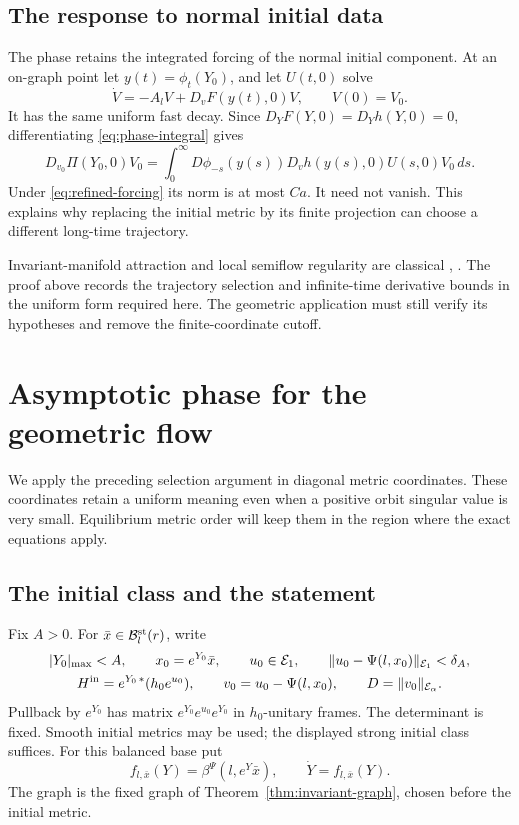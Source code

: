 \documentclass[11pt]{amsart}
\theoremstyle{definition}
\theoremstyle{remark}
\begin{document}
\subsection{The response to normal initial data}
The phase retains the integrated forcing of the normal initial
component. At an on-graph point let $y(t)=\phi_t(Y_0)$, and let
$U(t,0)$ solve
\[
 \dot V=-A_lV+D_vF(y(t),0)V,\qquad V(0)=V_0.
\]
It has the same uniform fast decay. Since $D_YF(Y,0)=D_Yh(Y,0)=0$,
differentiating \eqref{eq:phase-integral} gives
\begin{equation}\label{eq:normal-phase-response}
 D_{v_0}\Pi(Y_0,0)V_0
   =\int_0^\infty D\phi_{-s}(y(s))
        D_vh(y(s),0)U(s,0)V_0\,ds .
\end{equation}
Under \eqref{eq:refined-forcing} its norm is at most $Ca$.
It need not vanish. This explains why replacing the initial metric
by its finite projection can choose a different long-time trajectory.

Invariant-manifold attraction and local semiflow regularity are
classical \cite[Theorem 2.3]{Simonett94},
\cite[Theorem 3.1]{Simonett95}. The proof above records the
trajectory selection and infinite-time derivative bounds in the
uniform form required here. The geometric application must still
verify its hypotheses and remove the finite-coordinate cutoff.

\section{Asymptotic phase for the geometric flow}\label{sec:geometric-phase}

We apply the preceding selection argument in diagonal metric coordinates.
These coordinates retain a uniform meaning even when a positive orbit
singular value is very small. Equilibrium metric order will keep them
in the region where the exact equations apply.

\subsection{The initial class and the statement}
Fix $A>0$. For $\bar x\in\mathcal B_l^{\rm st}(r)$, write
\begin{equation}\label{eq:local-initial}
 \begin{gathered}
 |Y_0|_{\max}<A,\qquad x_0=e^{Y_0}\bar x,\qquad
 u_0\in\mathcal E_1,\qquad
 \|u_0-\Psi(l,x_0)\|_{\mathcal E_1}<\delta_A,\\
 H^{\rm in}=e^{Y_0\,*}(h_0e^{u_0}),\qquad
 v_0=u_0-\Psi(l,x_0),\qquad D=\|v_0\|_{\mathcal E_\alpha}.
 \end{gathered}
\end{equation}
Pullback by $e^{Y_0}$ has matrix $e^{Y_0}e^{u_0}e^{Y_0}$ in
$h_0$-unitary frames. The determinant is fixed. Smooth initial
metrics may be used; the displayed strong initial class suffices.
For this balanced base put
\begin{equation}\label{eq:diagonal-finite-field}
 f_{l,\bar x}(Y)=\beta^\Psi(l,e^Y\bar x),\qquad \dot Y=f_{l,\bar x}(Y).
\end{equation}
The graph is the fixed graph of Theorem~\ref{thm:invariant-graph},
chosen before the initial metric.
\end{document}
